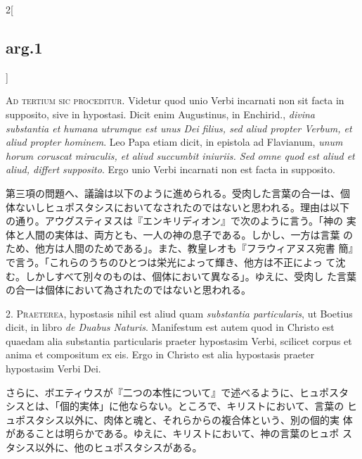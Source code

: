 \documentclass[paper=a4paper,fontsize=10pt,jafontsize=9pt,titlepage]{jlreq}
\begin{document}
\begin{paracol}{2}[\subsection{arg.1}]

{\Huge A}{\scshape d tertium sic proceditur}. Videtur quod unio Verbi
incarnati non sit facta in supposito, sive in hypostasi. Dicit enim
Augustinus, in Enchirid., {\itshape divina substantia et humana
utrumque est unus Dei filius, sed aliud propter Verbum, et aliud
propter hominem}. Leo Papa etiam dicit, in epistola ad Flavianum,
{\itshape unum horum coruscat miraculis, et aliud succumbit
iniuriis. Sed omne quod est aliud et aliud, differt supposito}. Ergo
unio Verbi incarnati non est facta in supposito.

\switchcolumn

第三項の問題へ、議論は以下のように進められる。受肉した言葉の合一は、個
体ないしヒュポスタシスにおいてなされたのではないと思われる。理由は以下
の通り。アウグスティヌスは『エンキリディオン』で次のように言う。「神の
実体と人間の実体は、両方とも、一人の神の息子である。しかし、一方は言葉
のため、他方は人間のためである」。また、教皇レオも『フラウィアヌス宛書
簡』で言う。「これらのうちのひとつは栄光によって輝き、他方は不正によっ
て沈む。しかしすべて別々のものは、個体において異なる」。ゆえに、受肉し
た言葉の合一は個体において為されたのではないと思われる。


2. {\scshape Praeterea}, hypostasis nihil est aliud quam {\itshape
substantia particularis}, ut Boetius dicit, in libro {\itshape de
Duabus Naturis}. Manifestum est autem quod in Christo est quaedam alia
substantia particularis praeter hypostasim Verbi, scilicet corpus et
anima et compositum ex eis. Ergo in Christo est alia hypostasis
praeter hypostasim Verbi Dei.

\switchcolumn

さらに、ボエティウスが『二つの本性について』で述べるように、ヒュポスタ
シスとは、「個的実体」に他ならない。ところで、キリストにおいて、言葉の
ヒュポスタシス以外に、肉体と魂と、それらからの複合体という、別の個的実
体があることは明らかである。ゆえに、キリストにおいて、神の言葉のヒュポ
スタシス以外に、他のヒュポスタシスがある。



\end{paracol}
\end{document}
